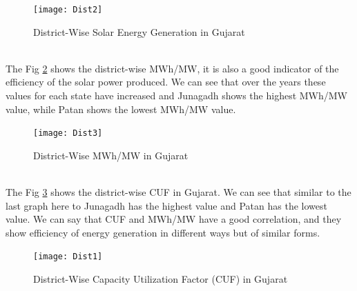 \begin{figure}[H]
\centering
\texttt{[image: Dist2]}
\caption{District-Wise Solar Energy Generation in Gujarat}
\label{figc2h4} %
\end{figure}
\\
The Fig \ref{figc2h5} shows the district-wise MWh/MW, it is also a good indicator of the efficiency of the solar power produced. We can see that over the years these values for each state have increased and Junagadh shows the highest MWh/MW value, while Patan shows the lowest MWh/MW value.
\\

\begin{figure}[H]
\centering
\texttt{[image: Dist3]}
\caption{District-Wise MWh/MW in Gujarat}
\label{figc2h5} %
\end{figure}
\\
The Fig \ref{figc2h6} shows the district-wise CUF in Gujarat. We can see that similar to the last graph here to Junagadh has the highest value and Patan has the lowest value. We can say that CUF and MWh/MW have a good correlation, and they show efficiency of energy generation in different ways but of similar forms.
\\

\begin{figure}[H]
\centering
\texttt{[image: Dist1]}
\caption{District-Wise Capacity Utilization Factor (CUF) in Gujarat}
\label{figc2h6} %
\end{figure}

